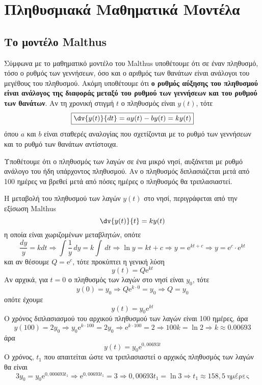 \section*{Πληθυσμιακά Μαθηματικά Μοντέλα}

\subsection*{Το μοντέλο Malthus}


Σύμφωνα με το μαθηματικό μοντέλο του Malthus υποθέτουμε ότι σε έναν πληθυσμό, τόσο ο 
ρυθμός των γεννήσεων, όσο και ο αριθμός των θανάτων είναι ανάλογοι του μεγέθους του 
πληθυσμού. Ακόμη υποθέτουμε ότι \textbf{ο ρυθμός αύξησης του πληθυσμού είναι ανάλογος 
της διαφοράς μεταξύ του ρυθμού των γεννήσεων και του ρυθμού των θανάτων}. 
Αν τη χρονική στιγμή $t$ ο πληθυσμός είναι $ y(t) $, τότε 
\[
  \boxed{  \dv{y(t)}{dt} = ay(t)-by(t) = ky(t) }
\] 
όπου $a$ και $b$ είναι σταθερές αναλογίας που σχετίζονται με το ρυθμό των γεννήσεων και 
το ρυθμό των θανάτων αντίστοιχα.


\begin{myboxs1}
\begin{problem}
  Υποθέτουμε ότι ο πληθυσμός των λαγών σε ένα μικρό νησί, αυξάνεται με ρυθμό ανάλογο 
  του ήδη υπάρχοντος πληθυσμού. Αν ο πληθυσμός διπλασιάζεται μετά από 100 ημέρες να
  βρεθεί μετά από πόσες ημέρες ο πληθυσμός θα τριπλασιαστεί.
\end{problem}
\end{myboxs1}
\begin{solution}
  Η μεταβολή του πληθυσμού των λαγών $ y(t) $ στο νησί, περιγράφεται από την 
  εξίσωση Malthus 
  \[
    \dv{y(t)}{t} = ky(t) 
  \]
  η οποία είναι χωριζομένων μεταβλητών, οπότε
  \[
    \frac{dy}{y} = k dt \Rightarrow \int \frac{1}{y} \,{dy} = k \int \,{dt} \Rightarrow
    \ln{y} = k t + c \Rightarrow y = \mathrm{e}^{kt+c} \Rightarrow y = \mathrm{e}^{c} 
    \cdot \mathrm{e}^{kt}  
  \] 
  και αν θέσουμε $ Q = \mathrm{e}^{c} $, τότε προκύπτει η γενική λύση 
  \[
    y(t) = Q \mathrm{e}^{kt} 
  \]
  Αν αρχικά, για $ t=0 $ ο πληθυσμός των λαγών στο νησί είναι $ y_{0} $, τότε 
  \[
    y(0)= y_{0} \Rightarrow Q \mathrm{e}^{k \cdot 0} = y_{0} \Rightarrow Q = y_{0} 
  \] 
  οπότε έχουμε
  \[
    y(t) = y_{0} \mathrm{e}^{kt} 
  \] 
  Ο χρόνος διπλασιασμού του αρχικού πληθυσμού των λαγών είναι 100 ημέρες, άρα 
  \[
    y(100) = 2 y_{0} \Rightarrow y_{0} \mathrm{e}^{k \cdot 100} = 2 y_{0} \Rightarrow 
    \mathrm{e}^{k \cdot 100} = 2 \Rightarrow 100 k = \ln{2} \Rightarrow k 
    \approx 0.00693 
  \] 
  άρα 
  \[
    y(t) = y_{0} \mathrm{e}^{0,00693t}  
  \] 
  Ο χρόνος, $ t_{1} $ που απαιτείται ώστε να τριπλασιαστεί ο αρχικός πληθυσμός 
  των λαγών θα είναι
  \[
    3 y_{0} = y_{0} \mathrm{e}^{0,000693 t_{1}} \Rightarrow  \mathrm{e}^{0,00693 t_{1}}
    = 3 \Rightarrow 0,00693 t_{1} = \ln{3} \Rightarrow t_{1} \approx 158,5 \;
    \text{ημέρες}
  \] 
\end{solution}

